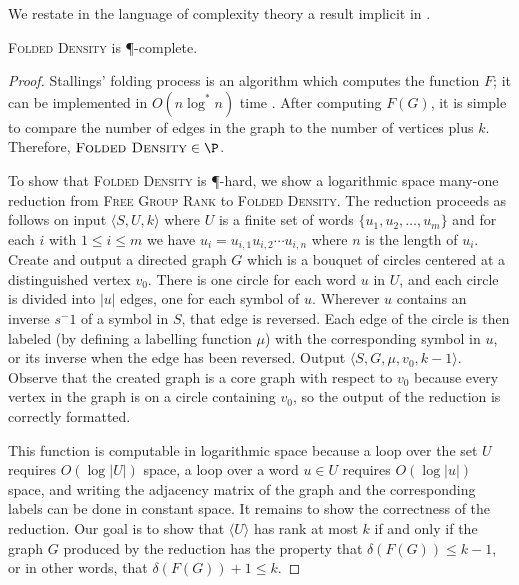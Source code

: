 \documentclass{article}
\newcommand{\FGR}{\textsc{Free Group Rank}}
\newcommand{\FD}{\textsc{Folded Density}}
\newcommand{\triple}[3]{\langle #1, #2, #3 \rangle}
\newcommand{\quint}[5]{\langle #1, #2, #3, #4, #5 \rangle}
\newcommand{\gen}[1]{\langle #1 \rangle}
\begin{document}
We restate in the language of complexity theory a result implicit in \cite{km02}.
\begin{theorem}
  \FD{} is \P-complete.
\end{theorem}
\begin{proof}
  Stallings' folding process \cite[Algorithm~5.4]{stallings83} is an algorithm which computes the function $F$; it can be implemented in $O(n \log^* n)$ time \cite{touikan06}.
  After computing $F(G)$, it is simple to compare the number of edges in the graph to the number of vertices plus $k$.
  Therefore, $\FD \in \P$.

  To show that \FD{} is \P-hard, we show a logarithmic space many-one reduction from \FGR{} to \FD.
  The reduction proceeds as follows on input $\triple{S}{U}{k}$ where $U$ is a finite set of words $\{u_1, u_2, \dotsc, u_m\}$ and for each $i$ with $1 \leq i \leq m$ we have $u_i = u_{i, 1}u_{i, 2}\dotsb u_{i, n}$ where $n$ is the length of $u_i$.
  Create and output a directed graph $G$ which is a bouquet of circles centered at a distinguished vertex $v_0$.
  There is one circle for each word $u$ in $U$, and each circle is divided into $|u|$ edges, one for each symbol of $u$.
  Wherever $u$ contains an inverse $s^-1$ of a symbol in $S$, that edge is reversed.
  Each edge of the circle is then labeled (by defining a labelling function $\mu$) with the corresponding symbol in $u$, or its inverse when the edge has been reversed.
  Output $\quint{S}{G}{\mu}{v_0}{k - 1}$.
  Observe that the created graph is a core graph with respect to $v_0$ because every vertex in the graph is on a circle containing $v_0$, so the output of the reduction is correctly formatted.

  This function is computable in logarithmic space because a loop over the set $U$ requires $O(\log |U|)$ space, a loop over a word $u \in U$ requires $O(\log |u|)$ space, and writing the adjacency matrix of the graph and the corresponding labels can be done in constant space.
  It remains to show the correctness of the reduction.
  Our goal is to show that $\gen{U}$ has rank at most $k$ if and only if the graph $G$ produced by the reduction has the property that $\delta(F(G)) \leq k - 1$, or in other words, that $\delta(F(G)) + 1 \leq k$.


\end{proof}
\end{document}
